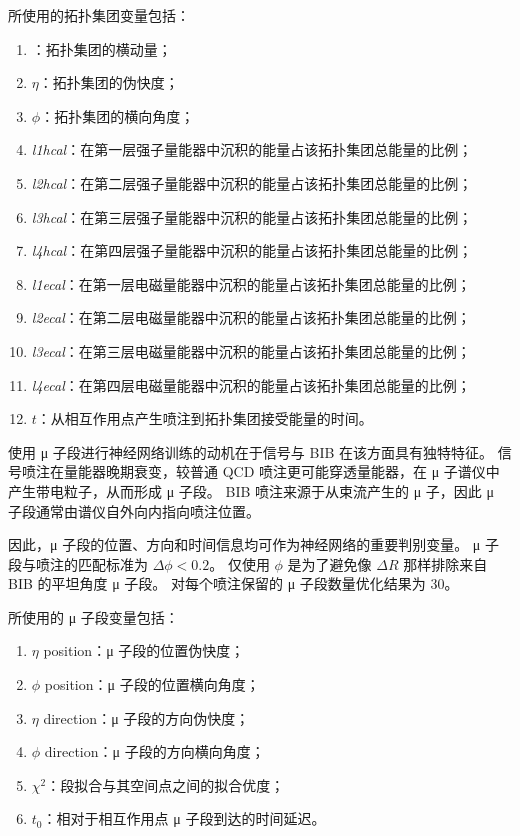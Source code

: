 所使用的拓扑集团变量包括：
\begin{enumerate}
      \item \pt：拓扑集团的横动量；
      \item $\eta$：拓扑集团的伪快度；
      \item $\phi$：拓扑集团的横向角度；
      \item \textit{l1hcal}：在第一层强子量能器中沉积的能量占该拓扑集团总能量的比例；
      \item \textit{l2hcal}：在第二层强子量能器中沉积的能量占该拓扑集团总能量的比例；
      \item \textit{l3hcal}：在第三层强子量能器中沉积的能量占该拓扑集团总能量的比例；
      \item \textit{l4hcal}：在第四层强子量能器中沉积的能量占该拓扑集团总能量的比例；
      \item \textit{l1ecal}：在第一层电磁量能器中沉积的能量占该拓扑集团总能量的比例；
      \item \textit{l2ecal}：在第二层电磁量能器中沉积的能量占该拓扑集团总能量的比例；
      \item \textit{l3ecal}：在第三层电磁量能器中沉积的能量占该拓扑集团总能量的比例；
      \item \textit{l4ecal}：在第四层电磁量能器中沉积的能量占该拓扑集团总能量的比例；
      \item $t$：从相互作用点产生喷注到拓扑集团接受能量的时间。
\end{enumerate}

使用 μ 子段进行神经网络训练的动机在于信号与 BIB 在该方面具有独特特征。
信号喷注在量能器晚期衰变，较普通 QCD 喷注更可能穿透量能器，在 μ 子谱仪中产生带电粒子，从而形成 μ 子段。
BIB 喷注来源于从束流产生的 μ 子，因此 μ 子段通常由谱仪自外向内指向喷注位置。

因此，μ 子段的位置、方向和时间信息均可作为神经网络的重要判别变量。
μ 子段与喷注的匹配标准为 $\Delta \phi < 0.2$。
仅使用 $\phi$ 是为了避免像 $\Delta R$ 那样排除来自 BIB 的平坦角度 μ 子段。
对每个喷注保留的 μ 子段数量优化结果为 30。

所使用的 μ 子段变量包括：
\begin{enumerate}
      \item $\eta$ position：μ 子段的位置伪快度；
      \item $\phi$ position：μ 子段的位置横向角度；
      \item $\eta$ direction：μ 子段的方向伪快度；
      \item $\phi$ direction：μ 子段的方向横向角度；
      \item $\chi^2$：段拟合与其空间点之间的拟合优度；
      \item $t_0$：相对于相互作用点 μ 子段到达的时间延迟。
\end{enumerate}

